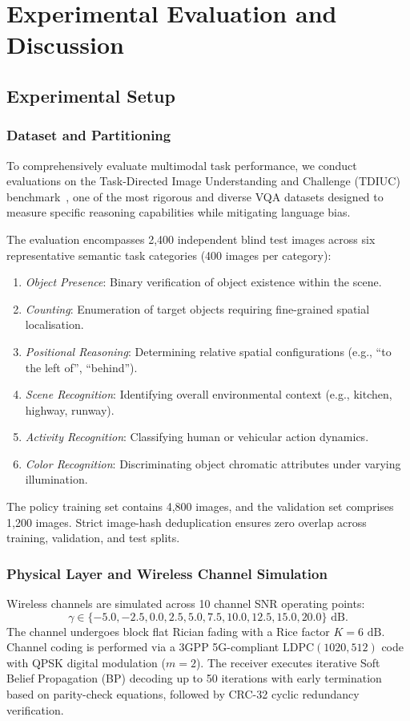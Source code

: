 \section{Experimental Evaluation and Discussion}\label{sec:experiments}

\subsection{Experimental Setup}
\subsubsection{Dataset and Partitioning}
To comprehensively evaluate multimodal task performance, we conduct evaluations on the Task-Directed Image Understanding and Challenge (TDIUC) benchmark~\cite{kafle2017tdiuc}, one of the most rigorous and diverse VQA datasets designed to measure specific reasoning capabilities while mitigating language bias. 

The evaluation encompasses 2,400 independent blind test images across six representative semantic task categories (400 images per category):
\begin{enumerate}
    \item \textit{Object Presence}: Binary verification of object existence within the scene.
    \item \textit{Counting}: Enumeration of target objects requiring fine-grained spatial localisation.
    \item \textit{Positional Reasoning}: Determining relative spatial configurations (e.g., ``to the left of'', ``behind'').
    \item \textit{Scene Recognition}: Identifying overall environmental context (e.g., kitchen, highway, runway).
    \item \textit{Activity Recognition}: Classifying human or vehicular action dynamics.
    \item \textit{Color Recognition}: Discriminating object chromatic attributes under varying illumination.
\end{enumerate}
The policy training set contains 4,800 images, and the validation set comprises 1,200 images. Strict image-hash deduplication ensures zero overlap across training, validation, and test splits.

\subsubsection{Physical Layer and Wireless Channel Simulation}
Wireless channels are simulated across 10 channel SNR operating points:
\begin{equation}
\gamma \in \{-5.0, -2.5, 0.0, 2.5, 5.0, 7.5, 10.0, 12.5, 15.0, 20.0\}\text{ dB}.
\end{equation}
The channel undergoes block flat Rician fading with a Rice factor $K = 6\text{ dB}$. Channel coding is performed via a 3GPP 5G-compliant $\text{LDPC}(1020, 512)$ code with QPSK digital modulation ($m=2$). The receiver executes iterative Soft Belief Propagation (BP) decoding up to 50 iterations with early termination based on parity-check equations, followed by CRC-32 cyclic redundancy verification.

